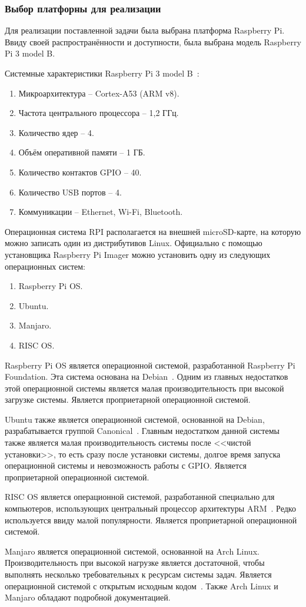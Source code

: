 \subsubsection{Выбор платфорны для реализации}

Для реализации поставленной задачи была выбрана платформа Raspberry Pi. Ввиду своей распространённости и доступности, была выбрана модель Raspberry Pi 3 model B.

Системные характеристики Raspberry Pi 3 model B~\cite{rpi-site}:

\begin{enumerate}
  \item Микроархитектура -- Cortex-A53 (ARM v8).
  \item Частота центрального процессора -- 1,2 ГГц.
  \item Количество ядер -- 4.
  \item Объём оперативной памяти -- 1 ГБ.
  \item Количество контактов GPIO -- 40.
  \item Количество USB портов -- 4.
  \item Коммуникации -- Ethernet, Wi-Fi, Bluetooth.
\end{enumerate}

Операционная система RPI располагается на внешней microSD-карте, на которую можно записать один из дистрибутивов Linux. Официально с помощью установщика Raspberry Pi Imager можно установить одну из следующих операционных систем:

\begin{enumerate}
  \item Raspberry Pi OS.
  \item Ubuntu.
  \item Manjaro.
  \item RISC OS.
\end{enumerate}

Raspberry Pi OS является операционной системой, разработанной Rasp\-berry Pi Foundation. Эта система основана на Debian~\cite{rpi-site}. Одним из главных недостатков этой операционной системы является малая производительность при высокой загрузке системы. Является проприетарной операционной системой.

Ubuntu также является операционной системой, основанной на Debian, разрабатывается группой Canonical~\cite{ubuntu}. Главным недостатком данной системы также является малая производительность системы после <<чистой установки>>, то есть сразу после установки системы,  долгое время запуска операционной системы и невозможность работы с GPIO. Является проприетарной операционной системой.

RISC OS является операционной системой, разработанной специально для компьютеров, использующих центральный процессор архитектуры ARM~\cite{risc-os}. Редко используется ввиду малой популярности. Является проприетарной операционной системой.

Manjaro является операционной системой, основанной на Arch Linux. Производительность при высокой нагрузке является достаточной, чтобы выполнять несколько требовательных к ресурсам системы задач. Является операционной системой с открытым исходным кодом~\cite{manjaro}. Также Arch Linux и Manjaro обладают подробной документацией.
